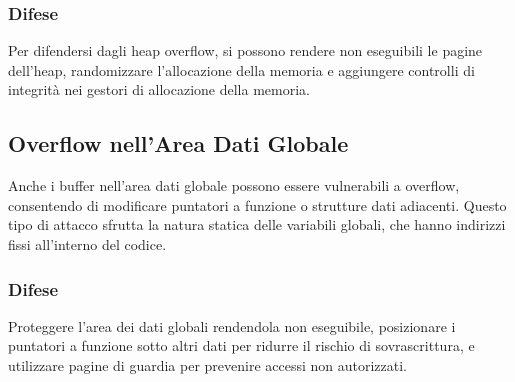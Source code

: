 \subsubsection{Difese}

Per difendersi dagli heap overflow, si possono rendere non eseguibili le pagine dell'heap, randomizzare l'allocazione della memoria e aggiungere controlli di integrità nei gestori di allocazione della memoria.

\subsection{Overflow nell'Area Dati Globale}

Anche i buffer nell'area dati globale possono essere vulnerabili a overflow, consentendo di modificare puntatori a funzione o strutture dati adiacenti. Questo tipo di attacco sfrutta la natura statica delle variabili globali, che hanno indirizzi fissi all'interno del codice.

\subsubsection{Difese}

Proteggere l'area dei dati globali rendendola non eseguibile, posizionare i puntatori a funzione sotto altri dati per ridurre il rischio di sovrascrittura, e utilizzare pagine di guardia per prevenire accessi non autorizzati.
